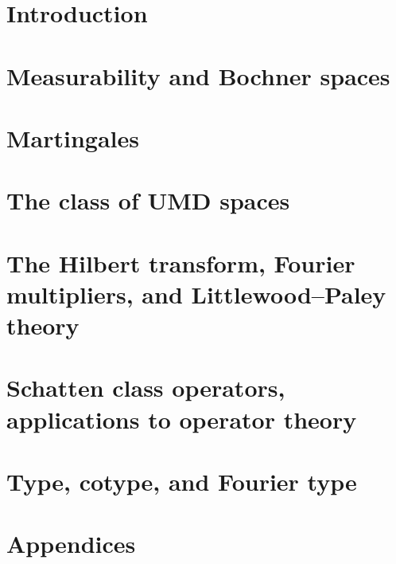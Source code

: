 \documentclass[a4paper,10pt,intlimits,sumlimits]{amsart}
\begin{document}


\maketitle
\footnotesize
\tableofcontents
\normalsize

\section{Introduction}
\label{sec:intro}


\section{Measurability and Bochner spaces}
\label{sec:Bochner-spaces}


\section{Martingales}
\label{sec:martingales} 


\section{The class of UMD spaces}
\label{sec:UMD}


\section{The Hilbert transform, Fourier multipliers, and Littlewood--Paley theory}
\label{sec:HT}


\section{Schatten class operators, applications to operator theory}
\label{sec:schatten}


\section{Type, cotype, and Fourier type}
\label{sec:type}


\section{Appendices}
\label{sec:appendices}





\printbibliography

% 
%  
\end{document}
